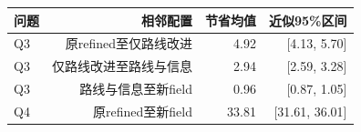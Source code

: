 \begin{tabular}{lrrr}
\toprule
问题 & 相邻配置 & 节省均值 & 近似95\%区间 \\
\midrule
Q3 & 原refined至仅路线改进 & 4.92 & [4.13, 5.70] \\
Q3 & 仅路线改进至路线与信息 & 2.94 & [2.59, 3.28] \\
Q3 & 路线与信息至新field & 0.96 & [0.87, 1.05] \\
Q4 & 原refined至新field & 33.81 & [31.61, 36.01] \\
\bottomrule
\end{tabular}
